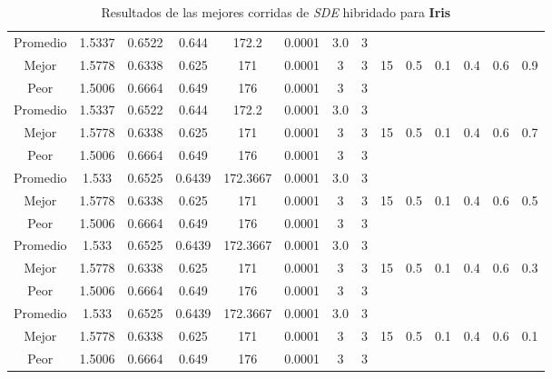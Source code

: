 \begin{table}[h!]
\begin{center}
\begin{tabular}{|c|c|c|c|c|c|c|c|c|c|c|c|c|c|}
        \hline
            Promedio  & 1.5337 & 0.6522 & 0.644 & 172.2 & 0.0001 & 3.0 & 3 &  &  &  &  &  & \\
            \cline{1-8}
            Mejor & 1.5778 & 0.6338  & 0.625 & 171 & 0.0001 & 3 & 3 & 15 & 0.5 & 0.1 & 0.4 & 0.6 & 0.9\\
            \cline{1-8}
            Peor & 1.5006 & 0.6664  & 0.649 & 176 & 0.0001 & 3 & 3 &  &  &  &  &  & \\
        \hline
        \hline
            Promedio  & 1.5337 & 0.6522 & 0.644 & 172.2 & 0.0001 & 3.0 & 3 &  &  &  &  &  & \\
            \cline{1-8}
            Mejor & 1.5778 & 0.6338  & 0.625 & 171 & 0.0001 & 3 & 3 & 15 & 0.5 & 0.1 & 0.4 & 0.6 & 0.7\\
            \cline{1-8}
            Peor & 1.5006 & 0.6664  & 0.649 & 176 & 0.0001 & 3 & 3 &  &  &  &  &  & \\
        \hline
        \hline
            Promedio  & 1.533 & 0.6525 & 0.6439 & 172.3667 & 0.0001 & 3.0 & 3 &  &  &  &  &  & \\
            \cline{1-8}
            Mejor & 1.5778 & 0.6338  & 0.625 & 171 & 0.0001 & 3 & 3 & 15 & 0.5 & 0.1 & 0.4 & 0.6 & 0.5\\
            \cline{1-8}
            Peor & 1.5006 & 0.6664  & 0.649 & 176 & 0.0001 & 3 & 3 &  &  &  &  &  & \\
        \hline
        \hline
            Promedio  & 1.533 & 0.6525 & 0.6439 & 172.3667 & 0.0001 & 3.0 & 3 &  &  &  &  &  & \\
            \cline{1-8}
            Mejor & 1.5778 & 0.6338  & 0.625 & 171 & 0.0001 & 3 & 3 & 15 & 0.5 & 0.1 & 0.4 & 0.6 & 0.3\\
            \cline{1-8}
            Peor & 1.5006 & 0.6664  & 0.649 & 176 & 0.0001 & 3 & 3 &  &  &  &  &  & \\
        \hline
        \hline
            Promedio  & 1.533 & 0.6525 & 0.6439 & 172.3667 & 0.0001 & 3.0 & 3 &  &  &  &  &  & \\
            \cline{1-8}
            Mejor & 1.5778 & 0.6338  & 0.625 & 171 & 0.0001 & 3 & 3 & 15 & 0.5 & 0.1 & 0.4 & 0.6 & 0.1\\
            \cline{1-8}
            Peor & 1.5006 & 0.6664  & 0.649 & 176 & 0.0001 & 3 & 3 &  &  &  &  &  & \\
        \hline
        \end{tabular}
        \caption{Resultados de las mejores corridas de \emph{SDE} hibridado para {\bf Iris}}
        \label{tb:tablesdehibcsv}
    \end{center}
\end{table}



